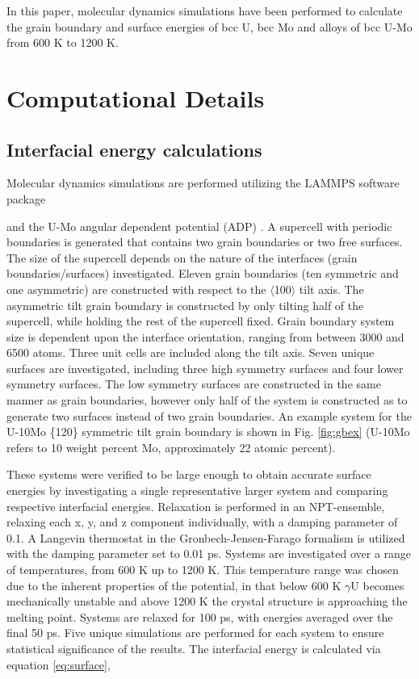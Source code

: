 \documentclass[review]{elsarticle}
\begin{document}
In this paper, molecular dynamics simulations have been performed to calculate the grain boundary and surface energies of bcc U, bcc Mo and alloys of bcc U-Mo from 600 K to 1200 K. 

\section{Computational Details}
\subsection{Interfacial energy calculations}
Molecular dynamics simulations are performed utilizing the LAMMPS \cite{plimpton1995} software package 


and the U-Mo angular dependent potential (ADP) \cite{smirnovaADP}. A supercell with periodic boundaries is generated that contains two grain boundaries or two free surfaces. The size of the supercell depends on the nature of the interfaces (grain boundaries/surfaces) investigated. Eleven grain boundaries (ten symmetric and one asymmetric) are constructed with respect to the $\langle$100$\rangle$ tilt axis. The asymmetric tilt grain boundary is constructed by only tilting half of the supercell, while holding the rest of the supercell fixed. Grain boundary system size is dependent upon the interface orientation, ranging from between 3000 and 6500 atoms. Three unit cells are included along the tilt axis. Seven unique surfaces are investigated, including three high symmetry surfaces and four lower symmetry surfaces. The low symmetry surfaces are constructed in the same manner as grain boundaries, however only half of the system is constructed as to generate two surfaces instead of two grain boundaries. An example system for the U-10Mo \{120\} symmetric tilt grain boundary is shown in Fig. \ref{fig:gbex} (U-10Mo refers to 10 weight percent Mo, approximately 22 atomic percent).



These systems were verified to be large enough to obtain accurate surface energies by investigating a single representative larger system and comparing respective interfacial energies. Relaxation is performed in an NPT-ensemble, relaxing each x, y, and z component individually, with a damping parameter of 0.1. A Langevin thermostat in the Gronbech-Jensen-Farago \cite{gjf2014} formalism is utilized with the damping parameter set to 0.01 ps. Systems are investigated over a range of temperatures, from 600 K up to 1200 K. This temperature range was chosen due to the inherent properties of the potential, in that below 600 K $\gamma$U becomes mechanically unstable and above 1200 K the crystal structure is approaching the melting point. Systems are relaxed for 100 ps, with energies averaged over the final 50 ps. Five unique simulations are performed for each system to ensure statistical significance of the results. The interfacial energy is calculated via equation \ref{eq:surface},
\end{document}

